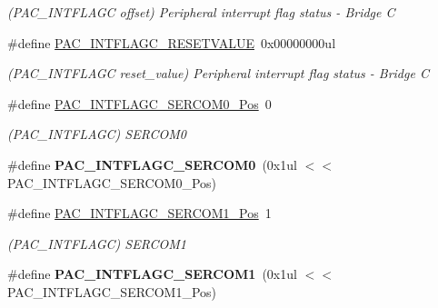 \begin{DoxyCompactItemize}
\begin{DoxyCompactList}\small\item\em (P\+A\+C\+\_\+\+I\+N\+T\+F\+L\+A\+G\+C offset) Peripheral interrupt flag status -\/ Bridge C \end{DoxyCompactList}\item 
\hypertarget{group___s_a_m_l21___p_a_c_ga2ce41e793355fdc0e3a1835e8ef29188}{}\#define \hyperlink{group___s_a_m_l21___p_a_c_ga2ce41e793355fdc0e3a1835e8ef29188}{P\+A\+C\+\_\+\+I\+N\+T\+F\+L\+A\+G\+C\+\_\+\+R\+E\+S\+E\+T\+V\+A\+L\+U\+E}~0x00000000ul\label{group___s_a_m_l21___p_a_c_ga2ce41e793355fdc0e3a1835e8ef29188}

\begin{DoxyCompactList}\small\item\em (P\+A\+C\+\_\+\+I\+N\+T\+F\+L\+A\+G\+C reset\+\_\+value) Peripheral interrupt flag status -\/ Bridge C \end{DoxyCompactList}\item 
\hypertarget{group___s_a_m_l21___p_a_c_gaa27538506fc52a980685318889343e6f}{}\#define \hyperlink{group___s_a_m_l21___p_a_c_gaa27538506fc52a980685318889343e6f}{P\+A\+C\+\_\+\+I\+N\+T\+F\+L\+A\+G\+C\+\_\+\+S\+E\+R\+C\+O\+M0\+\_\+\+Pos}~0\label{group___s_a_m_l21___p_a_c_gaa27538506fc52a980685318889343e6f}

\begin{DoxyCompactList}\small\item\em (P\+A\+C\+\_\+\+I\+N\+T\+F\+L\+A\+G\+C) S\+E\+R\+C\+O\+M0 \end{DoxyCompactList}\item 
\hypertarget{group___s_a_m_l21___p_a_c_ga2d3cbb9eab3cd5ded38f5c72fc07b75f}{}\#define {\bfseries P\+A\+C\+\_\+\+I\+N\+T\+F\+L\+A\+G\+C\+\_\+\+S\+E\+R\+C\+O\+M0}~(0x1ul $<$$<$ P\+A\+C\+\_\+\+I\+N\+T\+F\+L\+A\+G\+C\+\_\+\+S\+E\+R\+C\+O\+M0\+\_\+\+Pos)\label{group___s_a_m_l21___p_a_c_ga2d3cbb9eab3cd5ded38f5c72fc07b75f}

\item 
\hypertarget{group___s_a_m_l21___p_a_c_ga9226cef037ee2b558ef3beba6a9203e0}{}\#define \hyperlink{group___s_a_m_l21___p_a_c_ga9226cef037ee2b558ef3beba6a9203e0}{P\+A\+C\+\_\+\+I\+N\+T\+F\+L\+A\+G\+C\+\_\+\+S\+E\+R\+C\+O\+M1\+\_\+\+Pos}~1\label{group___s_a_m_l21___p_a_c_ga9226cef037ee2b558ef3beba6a9203e0}

\begin{DoxyCompactList}\small\item\em (P\+A\+C\+\_\+\+I\+N\+T\+F\+L\+A\+G\+C) S\+E\+R\+C\+O\+M1 \end{DoxyCompactList}\item 
\hypertarget{group___s_a_m_l21___p_a_c_ga2d91cb870556d41ed2811a00307d97ed}{}\#define {\bfseries P\+A\+C\+\_\+\+I\+N\+T\+F\+L\+A\+G\+C\+\_\+\+S\+E\+R\+C\+O\+M1}~(0x1ul $<$$<$ P\+A\+C\+\_\+\+I\+N\+T\+F\+L\+A\+G\+C\+\_\+\+S\+E\+R\+C\+O\+M1\+\_\+\+Pos)\label{group___s_a_m_l21___p_a_c_ga2d91cb870556d41ed2811a00307d97ed}


\end{DoxyCompactItemize}
